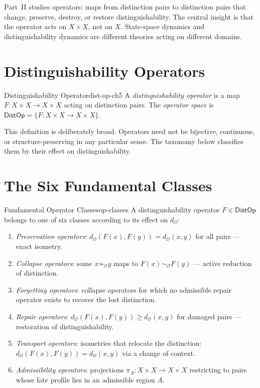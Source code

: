 \documentclass[12pt,twoside,openright]{book}
\newcommand{\distPairs}{X\times X}
\newcommand{\obs}{\mathcal{O}}
\newcommand{\distOp}{\mathsf{DistOp}}
\newcommand{\distMetric}{d_{\mathcal{O}}}
\begin{document}
Part~II studies operators: maps from distinction pairs to
distinction pairs that change, preserve, destroy, or restore
distinguishability. The central insight is that the operator
acts on $\distPairs$, not on $X$. State-space dynamics and
distinguishability dynamics are different theories acting on
different domains.

\section{Distinguishability Operators}

\begin{definition}{Distinguishability Operator}{dist-op-ch5}
A \emph{distinguishability operator} is a map
$F:\distPairs\to\distPairs$ acting on distinction pairs.
The \emph{operator space} is $\distOp=\{F:\distPairs\to
\distPairs\}$.
\end{definition}

This definition is deliberately broad. Operators need not be
bijective, continuous, or structure-preserving in any
particular sense. The taxonomy below classifies them by their
effect on distinguishability.

\section{The Six Fundamental Classes}

\begin{definition}{Fundamental Operator Classes}{op-classes}
A distinguishability operator $F\in\distOp$ belongs to one of
six classes according to its effect on $\distMetric$:
\begin{enumerate}[nosep,label=(\roman*)]
\item \emph{Preservation operators}: $\distMetric(F(x),F(y))=
  \distMetric(x,y)$ for all pairs --- exact isometry.
\item \emph{Collapse operators}: some $x\not\sim_\obs y$ maps
  to $F(x)\sim_\obs F(y)$ --- active reduction of distinction.
\item \emph{Forgetting operators}: collapse operators for
  which no admissible repair operator exists to recover the
  lost distinction.
\item \emph{Repair operators}: $\distMetric(F(x),F(y))\ge
  \distMetric(x,y)$ for damaged pairs --- restoration of
  distinguishability.
\item \emph{Transport operators}: isometries that relocate
  the distinction: $\distMetric(F(x),F(y))=\distMetric(x,y)$
  via a change of context.
\item \emph{Admissibility operators}: projections
  $\pi_A:\distPairs\to\distPairs$ restricting to pairs whose
  fate profile lies in an admissible region $A$.
\end{enumerate}
\end{definition}
\end{document}
